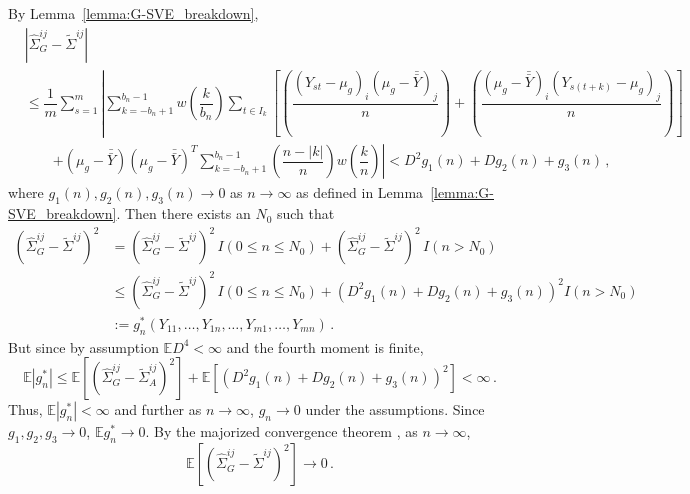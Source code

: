 \documentclass[12pt]{article}
\newcommand{\E}{\mathbb{E}}
\theoremstyle{remark}
\begin{document}
By Lemma~\ref{lemma:G-SVE_breakdown},
\begin{align*}
 &\left| \hat{\Sigma}_{G}^{ij} - \tilde{\Sigma}^{ij} \right|\\
 & \leq \dfrac{1}{m} \sum_{s=1}^m \left| \sum_{k=-b_n+1}^{b_n-1} w \left(\dfrac{k}{b_n} \right) \sum_{t \in I_k}   \left[ \left( \dfrac{(Y_{st} - \mu_g)_i(\mu_g-\bar{\bar{Y}})_j}{n}\right)+ \left(\dfrac{(\mu_g-\bar{\bar{Y}})_i(Y_{s(t+k)}-\mu_g)_j}{n}\right) \right] \right.\\
& \quad \quad  \left. + (\mu_g-\bar{\bar{Y}})(\mu_g-\bar{\bar{Y}})^T\sum_{k=-b_n+1}^{b_n-1}\left(\dfrac{n-|k|}{n}\right)w\left(\dfrac{k}{n}\right) \right|  < D^2g_1(n) + Dg_2(n) + g_3(n)\,,
\end{align*}
where $g_1(n), g_2(n), g_3(n) \to 0$ as $n \to \infty$ as defined in Lemma~\ref{lemma:G-SVE_breakdown}. Then there exists an $N_0$ such that
\begin{align*}
\left(\hat{\Sigma}_{G}^{ij} - \tilde{\Sigma}^{ij} \right)^2 &= \left(\hat{\Sigma}_{G}^{ij} - \tilde{\Sigma}^{ij} \right)^2 \, I(0 \leq n \leq N_0) + \left(\hat{\Sigma}_{G}^{ij} - \tilde{\Sigma}^{ij} \right)^2 \, I(n > N_0)\\
& \leq \left(\hat{\Sigma}_{G}^{ij} - \tilde{\Sigma}^{ij} \right)^2 \, I(0 \leq n \leq N_0) +  \left(D^2g_1(n) + Dg_2(n) + g_3(n) \right)^2 I(n > N_0)\\
& := g_n^*(Y_{11}, \dots, Y_{1n}, \dots, Y_{m1}, \dots, Y_{mn})\,.
\end{align*}
But since by assumption $\E D^4 <\infty$ and the fourth moment is finite,
\[
\E \left| g_n^* \right| \leq  \E \left[\left(\hat{\Sigma}_{G}^{ij} - \tilde{\Sigma}_{A}^{ij} \right)^2 \right] + \E \left[\left(D^2g_1(n) + Dg_2(n) + g_3(n) \right)^2 \right] < \infty\,.
\]
Thus, $\E \left| g_n^* \right| < \infty$ and further as $n \to \infty$, $g_n \to 0$ under the assumptions. Since $g_1, g_2, g_3 \to 0$, $\E g_n^* \to 0$. By the majorized convergence theorem \citep{zeid:2013}, as $n \to \infty$,
\begin{equation}
\label{eq:squared_mean_diff}
  \E \left[\left(\hat{\Sigma}_{G}^{ij} - \tilde{\Sigma}^{ij} \right)^2 \right] \to 0\,.
\end{equation}
\end{document}
